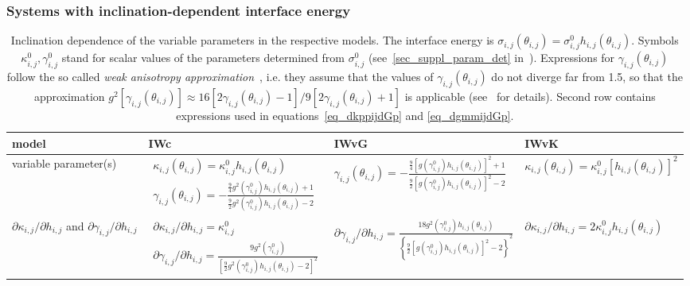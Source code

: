 		\subsubsection{Systems with inclination-dependent interface energy} \label{sec_model_incldepIE}
		\begin{sidewaystable}[]
			\centering
			\caption[PF model - inclination dependence of the variable model parameters in the respective models]{Inclination dependence of the variable parameters in the respective models. The interface energy is $\sigma_{i,j}(\theta_{i,j})=\sigma_{i,j}^0h_{i,j}(\theta_{i,j})$. Symbols $\kappa_{i,j}^0, \gamma_{i,j}^0$ stand for scalar values of the parameters determined from $\sigma_{i,j}^0$ (see~\ref{sec_suppl_param_det} in~\cite{Minar2021suppl}). Expressions for $\gamma_{i,j}(\theta_{i,j})$ follow the so called \textit{weak anisotropy approximation}~\cite{Moelans2008}, i.e. they assume that the values of $\gamma_{i,j}(\theta_{i,j})$ do not diverge far from 1.5, so that the approximation $g^2[\gamma_{i,j}(\theta_{i,j})]\approx16[2\gamma_{i,j}(\theta_{i,j})-1]/9[2\gamma_{i,j}(\theta_{i,j}) +1]$ is applicable (see~\cite{Moelans2008} for details). Second row contains expressions used in equations~\ref{eq_dkppijdGp} and \ref{eq_dgmmijdGp}.}
			\label{tab_models_comp__par_incldep}
			\begin{tabular}{p{2cm}|>{\centering\arraybackslash}p{5cm}>{\centering\arraybackslash}p{5cm}>{\centering\arraybackslash}p{4.2cm}}
				\toprule
				model     & IWc & IWvG & IWvK  \\ \hline
				variable parameter(s)     & $\begin{array}{l}
					\kappa_{i,j}(\theta_{i,j})= \kappa_{i,j}^0h_{i,j}(\theta_{i,j}) \\
					\gamma_{i,j}(\theta_{i,j})= -\frac{\frac{9}{4}g^2(\gamma_{i,j}^0)h_{i,j}(\theta_{i,j})+1}{\frac{9}{2}g^2(\gamma_{i,j}^0)h_{i,j}(\theta_{i,j})-2}
				\end{array}$
				& $\gamma_{i,j}(\theta_{i,j})= -\frac{\frac{9}{4}[g(\gamma_{i,j}^0)h_{i,j}(\theta_{i,j})]^2+1}{\frac{9}{2}[g(\gamma_{i,j}^0)h_{i,j}(\theta_{i,j})]^2-2}$
				&
				$\kappa_{i,j}(\theta_{i,j})= \kappa_{i,j}^0[h_{i,j}(\theta_{i,j})]^2$ \\ \hline
				$\partial \kappa_{i,j}/\partial h_{i,j}$ and $\partial \gamma_{i,j}/\partial h_{i
					,j}$ 
				& $\begin{array}{l}
					\partial \kappa_{i,j}/\partial h_{i,j} = \kappa_{i,j}^0 \\
					\partial \gamma_{i,j}/\partial h_{i,j} = \frac{9g^2( \gamma_{i,j}^0)}{\left[\frac{9}{2}g^2(\gamma_{i,j}^0)h_{i,j}(\theta_{i,j}) - 2\right]^2}
				\end{array}$ 
				& $\partial \gamma_{i,j}/\partial h_{i,j} = \frac{18g^2(\gamma_{i,j}^0)h_{i,j}(\theta_{i,j})}{\left\{\frac{9}{2}[g(\gamma_{i,j}^0)h_{i,j}(\theta_{i,j})]^2 - 2\right\}^2}$ 
				& $\partial \kappa_{i,j}/\partial h_{i,j} = 2 \kappa_{i,j}^0h_{i,j}(\theta_{i,j})$\\
				\bottomrule
			\end{tabular}
		\end{sidewaystable}
